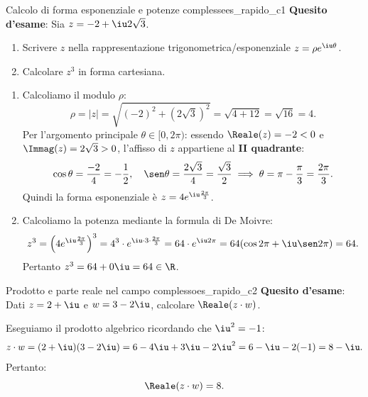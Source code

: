 \begin{esempio}{Calcolo di forma esponenziale e potenze complesse}{es_rapido_c1}
\textbf{Quesito d'esame}: Sia $z = -2 + \iu 2\sqrt{3}$.
\begin{enumerate}[label=(\alph*)]
    \item Scrivere $z$ nella rappresentazione trigonometrica/esponenziale $z = \rho e^{\iu\theta}$.
    \item Calcolare $z^3$ in forma cartesiana.
\end{enumerate}

\begin{dimostrazione}[Risoluzione]
\begin{enumerate}[label=(\alph*)]
    \item Calcoliamo il modulo $\rho$:
    \begin{equation}
        \rho = |z| = \sqrt{(-2)^2 + (2\sqrt{3})^2} = \sqrt{4 + 12} = \sqrt{16} = 4.
    \end{equation}
    Per l'argomento principale $\theta \in [0, 2\pi)$: essendo $\Reale(z) = -2 < 0$ e $\Immag(z) = 2\sqrt{3} > 0$, l'affisso di $z$ appartiene al \textbf{II quadrante}:
    \begin{equation}
        \cos\theta = \frac{-2}{4} = -\frac{1}{2}, \quad \sen\theta = \frac{2\sqrt{3}}{4} = \frac{\sqrt{3}}{2} \implies \theta = \pi - \frac{\pi}{3} = \frac{2\pi}{3}.
    \end{equation}
    Quindi la forma esponenziale è $z = 4 e^{\iu \frac{2\pi}{3}}$.
    \item Calcoliamo la potenza mediante la formula di De Moivre:
    \begin{equation}
        z^3 = \left(4 e^{\iu \frac{2\pi}{3}}\right)^3 = 4^3 \cdot e^{\iu \cdot 3 \cdot \frac{2\pi}{3}} = 64 \cdot e^{\iu 2\pi} = 64(\cos 2\pi + \iu\sen 2\pi) = 64.
    \end{equation}
    Pertanto $z^3 = 64 + 0\iu = 64 \in \R$.
\end{enumerate}
\end{dimostrazione}
\end{esempio}

\begin{esempio}{Prodotto e parte reale nel campo complesso}{es_rapido_c2}
\textbf{Quesito d'esame}: Dati $z = 2 + \iu$ e $w = 3 - 2\iu$, calcolare $\Reale(z \cdot w)$.

\begin{dimostrazione}[Risoluzione]
Eseguiamo il prodotto algebrico ricordando che $\iu^2 = -1$:
\begin{equation}
    z \cdot w = (2 + \iu)(3 - 2\iu) = 6 - 4\iu + 3\iu - 2\iu^2 = 6 - \iu - 2(-1) = 8 - \iu.
\end{equation}
Pertanto:
\begin{equation}
    \Reale(z \cdot w) = 8.
\end{equation}
\end{dimostrazione}
\end{esempio}

